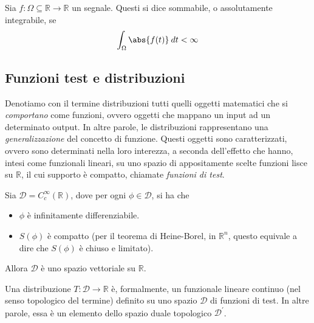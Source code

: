         \begin{definition}
            Sia $f: \Omega \subseteq \mathbb{R} \rightarrow \mathbb{R}$ un segnale.
            Questi si dice sommabile, o assolutamente integrabile, se
            \[
                \int_{\Omega} \abs{f(t)} \: dt < \infty
            \]
        \end{definition}

    \subsection{Funzioni test e distribuzioni}
        Denotiamo con il termine distribuzioni tutti quelli oggetti matematici che si \textit{comportano} come funzioni, ovvero oggetti che mappano un input ad un determinato output.
        In altre parole, le distribuzioni rappresentano una \textit{generalizzazione} del concetto di funzione.
        Questi oggetti sono caratterizzati, ovvero sono determinati nella loro interezza, a seconda dell'effetto che hanno, intesi come funzionali lineari, su uno spazio di appositamente scelte funzioni lisce su $\mathbb{R}$, il cui supporto è compatto, chiamate \textit{funzioni di test}.

        \begin{definition}
            Sia $\mathcal{D} = C^{\infty}_{c}(\mathbb{R})$, dove per ogni $\phi \in \mathcal{D}$, si ha che
            \begin{itemize}
                \item $\phi$ è infinitamente differenziabile.
                \item $S(\phi)$ è compatto (per il teorema di Heine-Borel, in $\mathbb{R}^{n}$, questo equivale a dire che $S(\phi)$ è chiuso e limitato).
            \end{itemize}

            Allora $\mathcal{D}$ è uno spazio vettoriale su $\mathbb{R}$.
        \end{definition}

        \begin{definition}
            Una distribuzione $T: \mathcal{D} \rightarrow \mathbb{R}$ è, formalmente, un funzionale lineare continuo (nel senso topologico del termine) definito su uno spazio $\mathcal{D}$ di funzioni di test.
            In altre parole, essa è un elemento dello spazio duale topologico $\mathcal{D}^{'}$.
        \end{definition}


